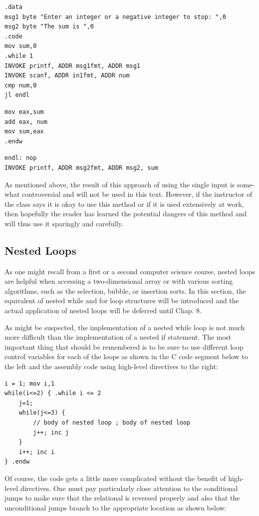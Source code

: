 \documentclass[10pt]{book}
\begin{document}
\begin{verbatim}
.data
msg1 byte "Enter an integer or a negative integer to stop: ",0
msg2 byte "The sum is ",0
.code
mov sum,0
.while 1
INVOKE printf, ADDR msg1fmt, ADDR msg1
INVOKE scanf, ADDR in1fmt, ADDR num
cmp num,0
jl endl
\end{verbatim}

\begin{verbatim}
mov eax,sum
add eax, num
mov sum,eax
.endw
\end{verbatim}

\begin{verbatim}
endl: nop
INVOKE printf, ADDR msg2fmt, ADDR msg2, sum
\end{verbatim}

As mentioned above, the result of this approach of using the single input is some-what controversial and will not be used in this text. However, if the instructor of the class says it is okay to use this method or if it is used extensively at work, then hopefully the reader has learned the potential dangers of this method and will thus use it sparingly and carefully.

\subsection{Nested Loops}
As one might recall from a first or a second computer science course, nested loops are helpful when accessing a two-dimensional array or with various sorting algorithms, such as the selection, bubble, or insertion sorts. In this section, the equivalent of nested while and for loop structures will be introduced and the actual application of nested loops will be deferred until Chap. 8.

As might be suspected, the implementation of a nested while loop is not much more difficult than the implementation of a nested if statement. The most important thing that should be remembered is to be sure to use different loop control variables for each of the loops as shown in the C code segment below to the left and the assembly code using high-level directives to the right:

\begin{verbatim}
i = 1; mov i,1
while(i<=2) { .while i <= 2
    j=1;
    while(j<=3) {
        // body of nested loop ; body of nested loop
        j++; inc j
    }
    i++; inc i
} .endw
\end{verbatim}

Of course, the code gets a little more complicated without the benefit of high-level directives. One must pay particularly close attention to the conditional jumps to make sure that the relational is reversed properly and also that the unconditional jumps branch to the appropriate location as shown below:
\end{document}
